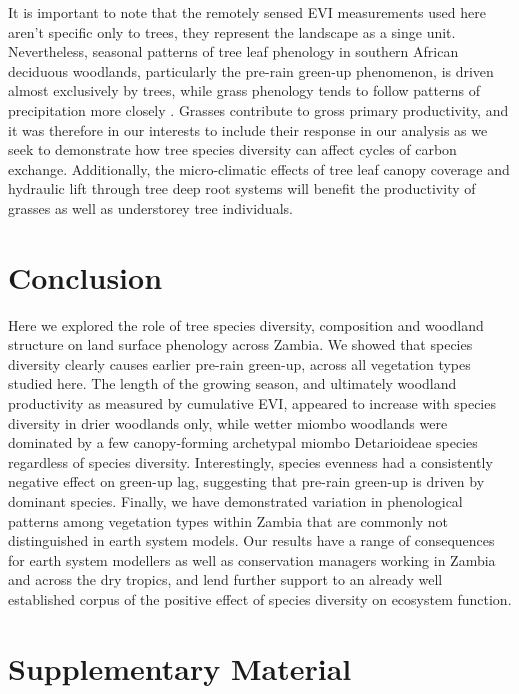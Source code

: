 \begin{refsection}
It is important to note that the remotely sensed EVI measurements used here aren't specific only to trees, they represent the landscape as a singe unit. Nevertheless, seasonal patterns of tree leaf phenology in southern African deciduous woodlands, particularly the pre-rain green-up phenomenon, is driven almost exclusively by trees, while grass phenology tends to follow patterns of precipitation more closely \citep{Whitecross2017, Archibald2007, Higgins2011}. Grasses contribute to gross primary productivity, and it was therefore in our interests to include their response in our analysis as we seek to demonstrate how tree species diversity can affect cycles of carbon exchange. Additionally, the micro-climatic effects of tree leaf canopy coverage and hydraulic lift through tree deep root systems will benefit the productivity of grasses as well as understorey tree individuals.

\section{Conclusion}
\label{phen:sec:conclusion}

Here we explored the role of tree species diversity, composition and woodland structure on land surface phenology across Zambia. We showed that species diversity clearly causes earlier pre-rain green-up, across all vegetation types studied here. The length of the growing season, and ultimately woodland productivity as measured by cumulative EVI, appeared to increase with species diversity in drier woodlands only, while wetter miombo woodlands were dominated by a few canopy-forming archetypal miombo Detarioideae species regardless of species diversity. Interestingly, species evenness had a consistently negative effect on green-up lag, suggesting that pre-rain green-up is driven by dominant species. Finally, we have demonstrated variation in phenological patterns among vegetation types within Zambia that are commonly not distinguished in earth system models. Our results have a range of consequences for earth system modellers as well as conservation managers working in Zambia and across the dry tropics, and lend further support to an already well established corpus of the positive effect of species diversity on ecosystem function.

\newpage{}
\begingroup
{}
\printbibliography[heading=subbibintoc]
\endgroup

\section{Supplementary Material}
\label{phen:sec:supp}
\begin{supplement} 


\end{supplement}
\end{refsection}
